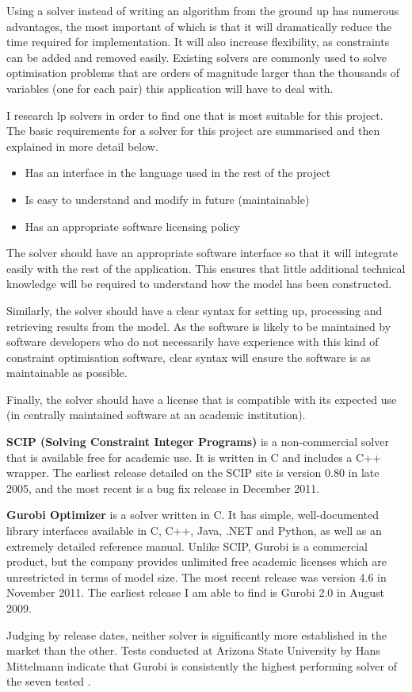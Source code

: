 Using a solver instead of writing an algorithm from the ground up has numerous
advantages, the most important of which is that it will dramatically reduce
the time required for implementation. It will also increase flexibility, as
constraints can be added and removed easily. Existing solvers are commonly
used to solve optimisation problems that are orders of magnitude larger than
the thousands of variables (one for each \studmod pair) this application will
have to deal with.

I research \gls{lp} solvers in order to find one that is most suitable for
this project. The basic requirements for a solver for this project are
summarised and then explained in more detail below.

\begin{itemize}
  \item Has an interface in the language used in the rest of the project
  \item Is easy to understand and modify in future (maintainable)
  \item Has an appropriate software licensing policy
\end{itemize}

The solver should have an appropriate software interface so that it will
integrate easily with the rest of the application. This ensures that little
additional technical knowledge will be required to understand how the model
has been constructed.

Similarly, the solver should have a clear syntax for setting up, processing
and retrieving results from the model. As the software is likely to be
maintained by software developers who do not necessarily have experience with
this kind of constraint optimisation software, clear syntax will ensure the
software is as maintainable as possible.

Finally, the solver should have a license that is compatible with its expected
use (in centrally maintained software at an academic institution).

\textbf{SCIP (Solving Constraint Integer Programs)} is a non-commercial solver
that is available free for academic use. It is written in C and includes a C++
wrapper. The earliest release detailed on the SCIP site is version 0.80 in
late 2005, and the most recent is a bug fix release in December 2011.

\textbf{Gurobi Optimizer} is a solver written in C. It has simple,
well-documented library interfaces available in C, C++, Java, .NET and Python,
as well as an extremely detailed reference manual. Unlike SCIP, Gurobi is a
commercial product, but the company provides unlimited free academic licenses
which are unrestricted in terms of model size. The most recent release was
version 4.6 in November 2011. The earliest release I am able to find is Gurobi
2.0 in August 2009.

Judging by release dates, neither solver is significantly more established in
the market than the other. Tests conducted at Arizona State University by Hans
Mittelmann indicate that Gurobi is consistently the highest performing solver
of the seven tested \cite{SolversPerformance_2012}.

